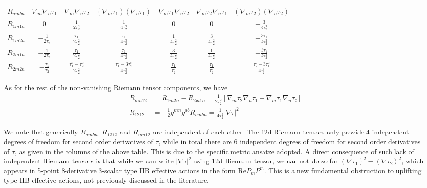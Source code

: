 \medskip
\renewcommand{\arraystretch}{1.8}
\begin{tabular}{c|cccccc}
\toprule
$R_{ambn}$ 
  & $\nabla_m\nabla_n\tau_1$ 
  & $\nabla_m\nabla_n\tau_2$ 
  & $(\nabla_m\tau_1)(\nabla_n\tau_1)$ 
  & $\nabla_m\tau_1\nabla_n\tau_2$ 
  & $\nabla_m\tau_2\nabla_n\tau_1$ 
  & $(\nabla_m\tau_2)(\nabla_n\tau_2)$ \\
\midrule
$R_{1m1n}$ & $0$ & $\frac{1}{2\tau_2^2}$ & $\frac{1}{4\tau_2^3}$ & $0$ & $0$ & $-\frac{3}{4\tau_2^3}$ \\
$R_{1m2n}$ & $-\frac{1}{2\tau_2}$ & $\frac{\tau_1}{2\tau_2^2}$ & $\frac{\tau_1}{4\tau_2^3}$ & $\frac{1}{4\tau_2^2}$ & $\frac{3}{4\tau_2^2}$ & $-\frac{3\tau_1}{4\tau_2^3}$ \\
$R_{2m1n}$ & $-\frac{1}{2\tau_2}$ & $\frac{\tau_1}{2\tau_2^2}$ & $\frac{\tau_1}{4\tau_2^3}$ & $\frac{3}{4\tau_2^2}$ & $\frac{1}{4\tau_2^2}$ & $-\frac{3\tau_1}{4\tau_2^3}$ \\
$R_{2m2n}$ & $-\frac{\tau_1}{\tau_2}$ & $\frac{\tau_1^2-\tau_2^2}{2\tau_2^2}$ & $\frac{\tau_1^2-3\tau_2^2}{4\tau_2^3}$ & $\frac{\tau_1}{\tau_2^2}$ & $\frac{\tau_1}{\tau_2^2}$ & $\frac{\tau_2^2-3\tau_1^2}{4\tau_2^3}$ \\
\bottomrule
\end{tabular}
\medskip

As for the rest of the non-vanishing Riemann tensor components, we have
\begin{equation}
\begin{aligned}
R_{mn12} 
&= R_{1m2n} - R_{2m1n}
= \frac{1}{2\tau_2^2}[\nabla_m\tau_2\nabla_n\tau_1-\nabla_m\tau_1\nabla_n\tau_2]\\
R_{1212}
&= -\frac{1}{2}g^{mn}g^{ab} R_{ambn} = \frac{1}{4\tau_2^2}|\nabla \tau|^2
\end{aligned}
\end{equation}

We note that generically $R_{ambn}$, $R_{1212}$ and $R_{mn12}$ are independent of each other.
The 12d Riemann tensors only provide 4 independent degrees of freedom for second order derivatives of $\tau$, while in total there are 6 independent degrees of freedom for second order derivatives of $\tau$, as given in the columns of the above table.
This is due to the specific metric ansatze adopted.
A direct consequence of such lack of independent Riemann tensors is that while we can write $|\nabla \tau|^2$ using 12d Riemann tensor, we can not do so for $(\nabla \tau_1)^2 - (\nabla \tau_2)^2$, which appears in 5-point 8-derivative 3-scalar type IIB effective actions in the form $\text{Re} P_m P^m$. This is a new fundamental obstruction to uplifting type IIB effective actions, not previously discussed in the literature.

